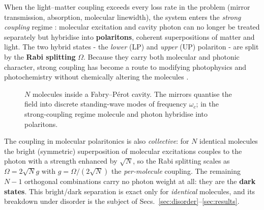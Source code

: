 \documentclass[12pt,a4paper]{article}
\begin{document}
When the light--matter coupling exceeds every loss rate in the problem (mirror
transmission, absorption, molecular linewidth), the system enters the
\emph{strong coupling} regime \cite{Ebbesen2016}: molecular excitation and
cavity photon can no longer be treated separately but hybridise into
\textbf{polaritons}, coherent superpositions of matter and light. The two
hybrid states - the \emph{lower} (LP) and \emph{upper} (UP) polariton -
are split by the \textbf{Rabi splitting} $\Omega$. Because they carry both
molecular and photonic character, strong coupling has become a route to
modifying photophysics and photochemistry without chemically altering the
molecules \cite{Ebbesen2016,Feist2018,Herrera2016}.

\begin{figure}[htbp]
\centering
{}
\caption{$N$ molecules inside a Fabry--P\'erot cavity. The mirrors quantise
the field into discrete standing-wave modes of frequency $\omega_c$; in the
strong-coupling regime molecule and photon hybridise into polaritons.}
\label{fig:cavity}
\end{figure}
\FloatBarrier

The coupling in molecular polaritonics is also \emph{collective}: for $N$
identical molecules the bright (symmetric)
superposition of molecular excitations couples to the photon with a strength
enhanced by $\sqrt{N}$, so the Rabi splitting scales as $\Omega=2\sqrt{N}g$
with $g=\Omega/(2\sqrt N)$ the \emph{per-molecule} coupling. The remaining
$N-1$ orthogonal combinations carry no photon weight at all: they are the
\textbf{dark states}. This bright/dark separation is exact only for
\emph{identical} molecules, and its breakdown under disorder is the
subject of Secs.~\ref{sec:disorder}--\ref{sec:results}.
\end{document}

